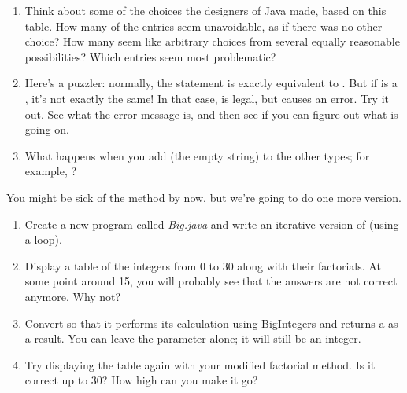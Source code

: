 \begin{exercise}
\begin{enumerate}
\item Think about some of the choices the designers of Java made, based on this table.
How many of the entries seem unavoidable, as if there was no other choice?
How many seem like arbitrary choices from several equally reasonable possibilities?
Which entries seem most problematic?

\item Here's a puzzler: normally, the statement  is exactly equivalent to .
But if  is a , it's not exactly the same!
In that case,  is legal, but  causes an error.
Try it out.
See what the error message is, and then see if you can figure out what is going on.

\item What happens when you add  (the empty string) to the other types; for example, ?


\end{enumerate}

\end{exercise}


\begin{exercise}  %


You might be sick of the  method by now, but we're going to do one more version.

\begin{enumerate}

\item Create a new program called {\it Big.java} and write an iterative version of  (using a  loop).

\item Display a table of the integers from 0 to 30 along with their factorials.
At some point around 15, you will probably see that the answers are not correct anymore.
Why not?

\item Convert  so that it performs its calculation using BigIntegers and returns a  as a result.
You can leave the parameter alone; it will still be an integer.

\item Try displaying the table again with your modified factorial method.
Is it correct up to 30?
How high can you make it go?

\end{enumerate}

\end{exercise}


